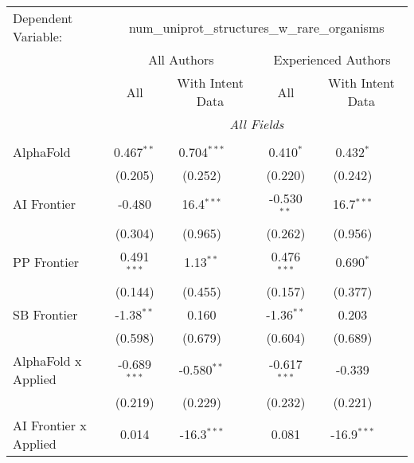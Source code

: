 \begingroup
\centering
\begin{tabular}{lcccccc}
   \tabularnewline \midrule \midrule
   Dependent Variable: & \multicolumn{6}{c}{num\_uniprot\_structures\_w\_rare\_organisms}\\
 & \multicolumn{3}{c}{All Authors} & \multicolumn{3}{c}{Experienced Authors} \\
\cmidrule(lr){2-4} \cmidrule(lr){5-7}
 & \multicolumn{1}{c}{All} & \multicolumn{2}{c}{With Intent Data} & \multicolumn{1}{c}{All} & \multicolumn{2}{c}{With Intent Data} \\
\cmidrule(lr){2-2} \cmidrule(lr){3-4} \cmidrule(lr){5-5} \cmidrule(lr){6-7}
 & \multicolumn{6}{c}{\textit{All Fields}} \\ \\
   AlphaFold                      & 0.467$^{**}$   & 0.704$^{***}$ &               & 0.410$^{*}$    & 0.432$^{*}$   &   \\   
                                  & (0.205)        & (0.252)       &               & (0.220)        & (0.242)       &   \\   
   AI Frontier                    & -0.480         & 16.4$^{***}$  &               & -0.530$^{**}$  & 16.7$^{***}$  &   \\   
                                  & (0.304)        & (0.965)       &               & (0.262)        & (0.956)       &   \\   
   PP Frontier                    & 0.491$^{***}$  & 1.13$^{**}$   &               & 0.476$^{***}$  & 0.690$^{*}$   &   \\   
                                  & (0.144)        & (0.455)       &               & (0.157)        & (0.377)       &   \\   
   SB Frontier                    & -1.38$^{**}$   & 0.160         &               & -1.36$^{**}$   & 0.203         &   \\   
                                  & (0.598)        & (0.679)       &               & (0.604)        & (0.689)       &   \\   
   AlphaFold x Applied            & -0.689$^{***}$ & -0.580$^{**}$ &               & -0.617$^{***}$ & -0.339        &   \\   
                                  & (0.219)        & (0.229)       &               & (0.232)        & (0.221)       &   \\   
   AI Frontier x Applied          & 0.014          & -16.3$^{***}$ &               & 0.081          & -16.9$^{***}$ &   \\   

\end{tabular}
